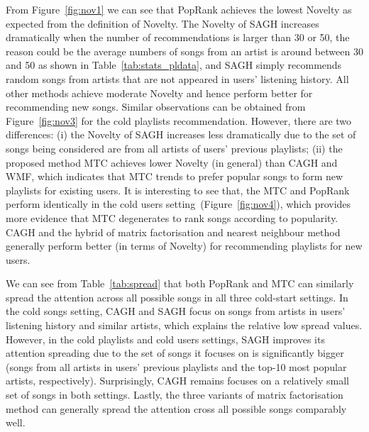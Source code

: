 From Figure~\ref{fig:nov1} we can see that PopRank achieves the lowest Novelty as expected from the definition of Novelty.
The Novelty of SAGH increases dramatically when the number of recommendations is larger than 30 or 50, the reason could be the average 
numbers of songs from an artist is around between 30 and 50 as shown in Table~\ref{tab:stats_pldata}, and SAGH simply recommends random
songs from artists that are not appeared in users' listening history.
All other methods achieve moderate Novelty and hence perform better for recommending new songs.
Similar observations can be obtained from Figure~\ref{fig:nov3} for the cold playlists recommendation.
However, there are two differences: (i) the Novelty of SAGH increases less dramatically due to the set of songs being considered are from
all artists of users' previous playlists; (ii) the proposed method MTC achieves lower Novelty (in general) than CAGH and WMF, which indicates
that MTC trends to prefer popular songs to form new playlists for existing users.
It is interesting to see that, the MTC and PopRank perform identically in the cold users setting~(Figure~\ref{fig:nov4}),
which provides more evidence that MTC degenerates to rank songs according to popularity.
CAGH and the hybrid of matrix factorisation and nearest neighbour method generally perform better (in terms of Novelty) for recommending 
playlists for new users.

We can see from Table~\ref{tab:spread} that both PopRank and MTC can similarly spread the attention across all possible songs in all three
cold-start settings. 
In the cold songs setting, CAGH and SAGH focus on songs from artists in users' listening history and similar artists, which explains 
the relative low spread values.
However, in the cold playlists and cold users settings, SAGH improves its attention spreading due to the set of songs it focuses on 
is significantly bigger (\ie songs from all artists in users' previous playlists and the top-10 most popular artists, respectively).
Surprisingly, CAGH remains focuses on a relatively small set of songs in both settings.
Lastly, the three variants of matrix factorisation method can generally spread the attention cross all possible songs comparably well.

